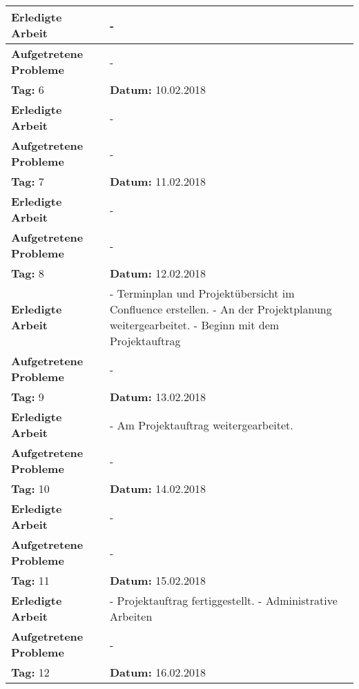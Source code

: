 \begin{longtable}{|p{5cm}|p{5cm}p{6cm}|}
\textbf{Erledigte Arbeit} & \multicolumn{2}{p{11cm}|}{-} \\ \hline
\textbf{Aufgetretene Probleme} & \multicolumn{2}{p{11cm}|}{-} \\ \hline
\rowcolor{heading}\textbf{Tag:} 6 & \textbf{Datum:} 10.02.2018 & \\ \hline
\textbf{Erledigte Arbeit} & \multicolumn{2}{p{11cm}|}{-} \\ \hline
\textbf{Aufgetretene Probleme} & \multicolumn{2}{p{11cm}|}{-} \\ \hline
\rowcolor{heading}\textbf{Tag:} 7 & \textbf{Datum:} 11.02.2018 & \\ \hline
\textbf{Erledigte Arbeit} & \multicolumn{2}{p{11cm}|}{-} \\ \hline
\textbf{Aufgetretene Probleme} & \multicolumn{2}{p{11cm}|}{-} \\ \hline
\rowcolor{heading}\textbf{Tag:} 8 & \textbf{Datum:} 12.02.2018 & \\ \hline
\textbf{Erledigte Arbeit} & \multicolumn{2}{p{11cm}|}{- Terminplan und Projektübersicht im Confluence erstellen. \newline
- An der Projektplanung weitergearbeitet. \newline
- Beginn mit dem Projektauftrag} \\ \hline
\textbf{Aufgetretene Probleme} & \multicolumn{2}{p{11cm}|}{-} \\ \hline
\rowcolor{heading}\textbf{Tag:} 9 & \textbf{Datum:} 13.02.2018 & \\ \hline
\textbf{Erledigte Arbeit} & \multicolumn{2}{p{11cm}|}{- Am Projektauftrag weitergearbeitet.} \\ \hline
\textbf{Aufgetretene Probleme} & \multicolumn{2}{p{11cm}|}{-} \\ \hline
\rowcolor{heading}\textbf{Tag:} 10 & \textbf{Datum:} 14.02.2018 & \\ \hline
\textbf{Erledigte Arbeit} & \multicolumn{2}{p{11cm}|}{-} \\ \hline
\textbf{Aufgetretene Probleme} & \multicolumn{2}{p{11cm}|}{-} \\ \hline
\rowcolor{heading}\textbf{Tag:} 11 & \textbf{Datum:} 15.02.2018 & \\ \hline
\textbf{Erledigte Arbeit} & \multicolumn{2}{p{11cm}|}{- Projektauftrag fertiggestellt. \newline
- Administrative Arbeiten} \\ \hline
\textbf{Aufgetretene Probleme} & \multicolumn{2}{p{11cm}|}{-} \\ \hline
\rowcolor{heading}\textbf{Tag:} 12 & \textbf{Datum:} 16.02.2018 & \\ \hline

\end{longtable}

